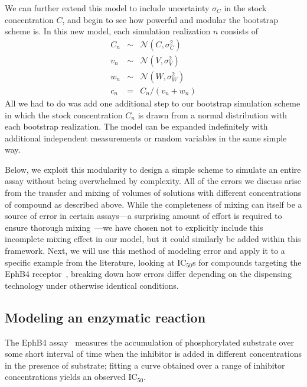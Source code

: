 \documentclass[aps,pre,twocolumn,nofootinbib,superscriptaddress,linenumbers]{revtex4-1}
\begin{document}
We can further extend this model to include uncertainty $\sigma_C$ in the stock concentration $C$, and begin to see how powerful and modular the bootstrap scheme is.
In this new model, each simulation realization $n$ consists of
\begin{eqnarray}
C_n &\sim& \mathcal{N}(C, \sigma_C^2) \nonumber \\
v_n &\sim& \mathcal{N}(V, \sigma_V^2) \nonumber \\
w_n &\sim& \mathcal{N}(W, \sigma_W^2) \nonumber \\
c_n &=& C_n / (v_n + w_n)
\end{eqnarray}
All we had to do was add one additional step to our bootstrap simulation scheme in which the stock concentration $C_n$ is drawn from a normal distribution with each bootstrap realization.
The model can be expanded indefinitely with additional independent measurements or random variables in the same simple way.

Below, we exploit this modularity to design a simple scheme to simulate an entire assay without being overwhelmed by complexity.
All of the errors we discuss arise  from the transfer and mixing of volumes of solutions with different concentrations of compound as described above.
While the completeness of mixing can itself be a source of error in certain assays---a surprising amount of effort is required to ensure thorough mixing~\cite{walling_mixing_2007,weiss_modeling_2002,mitre_turbo-mixing_2007}---we have chosen not to explicitly include this incomplete mixing effect in our model, but it could similarly be added within this framework.
Next, we will use this method of modeling error and apply it to a specific example from the literature, looking at IC$_{50}$s for compounds targeting the EphB4 receptor~\cite{ekins_dispensing_2013,barlaam_novel_2009,barlaam_pyrimidine_2010}, breaking down how errors differ depending on the dispensing technology under otherwise identical conditions.

\subsection*{Modeling an enzymatic reaction}

The EphB4 assay~\cite{ekins_dispensing_2013,barlaam_novel_2009,barlaam_pyrimidine_2010} measures the accumulation of phosphorylated substrate over some short interval of time when the inhibitor is added in different concentrations in the presence of substrate; fitting a curve obtained over a range of inhibitor concentrations yields an observed IC$_{50}$.
\end{document}
